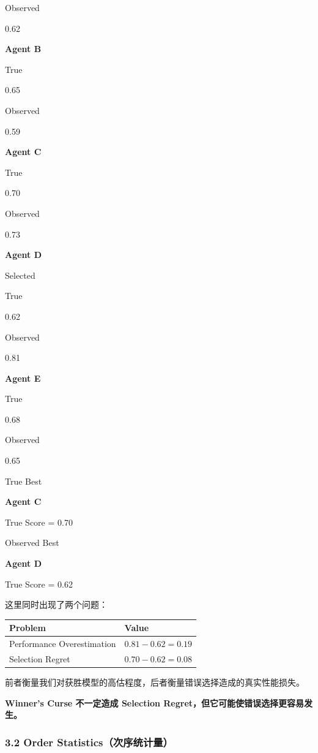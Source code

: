 Observed

0.62

\textbf{Agent B}

True

0.65

Observed

0.59

\textbf{Agent C}

True

0.70

Observed

0.73

\textbf{Agent D}

Selected

True

0.62

Observed

0.81

\textbf{Agent E}

True

0.68

Observed

0.65

True Best

\textbf{Agent C}

True Score = 0.70

Observed Best

\textbf{Agent D}

True Score = 0.62

这里同时出现了两个问题：

\begin{readertable}
\begin{longtable}[]{@{}
  >{\raggedright\arraybackslash}p{}
  >{\raggedleft\arraybackslash}p{}@{}}
\toprule
Problem & Value \\
\midrule
\endhead
Performance Overestimation & \(0.81-0.62=0.19\) \\
Selection Regret & \(0.70-0.62=0.08\) \\
\bottomrule
\end{longtable}
\end{readertable}

前者衡量我们对获胜模型的高估程度，后者衡量错误选择造成的真实性能损失。

\textbf{Winner's Curse 不一定造成 Selection Regret，但它可能使错误选择更容易发生。}

\hypertarget{part-2-16-0001-order-statisticsux6b21ux5e8fux7edfux8ba1ux91cf}{%
\subsubsection{3.2 Order Statistics（次序统计量）}\label{part-2-16-0001-order-statisticsux6b21ux5e8fux7edfux8ba1ux91cf}}

